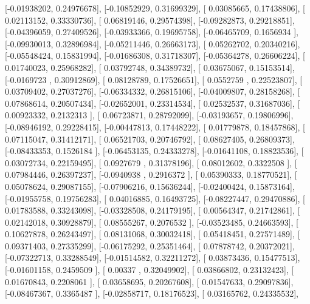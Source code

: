 \documentclass{article}
\begin{document}
       [-0.01938202,  0.24976678],
       [-0.10852929,  0.31699329],
       [ 0.03085665,  0.17438806],
       [ 0.02113152,  0.33330736],
       [ 0.06819146,  0.29574398],
       [-0.09282873,  0.29218851],
       [-0.04396059,  0.27409526],
       [-0.03933366,  0.19695758],
       [-0.06465709,  0.1656934 ],
       [-0.09930013,  0.32896984],
       [-0.05211446,  0.26663173],
       [ 0.05262702,  0.20340216],
       [-0.05548424,  0.15831994],
       [-0.01686308,  0.31718307],
       [-0.05364278,  0.26606224],
       [ 0.01740023,  0.25968282],
       [ 0.03792748,  0.34389732],
       [ 0.03675067,  0.15153514],
       [-0.0169723 ,  0.30912869],
       [ 0.08128789,  0.17526651],
       [ 0.0552759 ,  0.22523807],
       [ 0.03709402,  0.27037276],
       [-0.06334332,  0.26815106],
       [-0.04009807,  0.28158268],
       [ 0.07868614,  0.20507434],
       [-0.02652001,  0.23314534],
       [ 0.02532537,  0.31687036],
       [ 0.00923332,  0.2132313 ],
       [ 0.06723871,  0.28792099],
       [-0.03193657,  0.19806996],
       [-0.08946192,  0.29228415],
       [-0.00447813,  0.17448222],
       [ 0.01779878,  0.18457868],
       [ 0.07115047,  0.31412171],
       [ 0.06521703,  0.20746792],
       [ 0.08627405,  0.26809373],
       [-0.08433353,  0.1526184 ],
       [-0.06453135,  0.24333278],
       [-0.01641108,  0.18823536],
       [ 0.03072734,  0.22159495],
       [ 0.0927679 ,  0.31378196],
       [ 0.08012602,  0.3322508 ],
       [ 0.07984446,  0.26397237],
       [-0.0940938 ,  0.2916372 ],
       [ 0.05390333,  0.18770521],
       [ 0.05078624,  0.29087155],
       [-0.07906216,  0.15636244],
       [-0.02400424,  0.15873164],
       [-0.01955758,  0.19756283],
       [ 0.04016885,  0.16493725],
       [-0.08227447,  0.29470886],
       [ 0.01783588,  0.33243098],
       [-0.03328508,  0.24179195],
       [ 0.00564347,  0.21742861],
       [ 0.02142018,  0.30928879],
       [ 0.08555267,  0.2076532 ],
       [-0.03523485,  0.24663593],
       [ 0.10627878,  0.26243497],
       [ 0.08131068,  0.30032418],
       [ 0.05418451,  0.27571489],
       [ 0.09371403,  0.27335299],
       [-0.06175292,  0.25351464],
       [ 0.07878742,  0.20372021],
       [-0.07322713,  0.33288549],
       [-0.01514582,  0.32211272],
       [ 0.03873436,  0.15477513],
       [-0.01601158,  0.2459509 ],
       [ 0.00337   ,  0.32049902],
       [ 0.03866802,  0.23132423],
       [ 0.01670843,  0.2208061 ],
       [ 0.03658695,  0.20267608],
       [ 0.01547633,  0.29097836],
       [-0.08467367,  0.3365487 ],
       [-0.02858717,  0.18176523],
       [ 0.03165762,  0.24335532],
\end{document}
